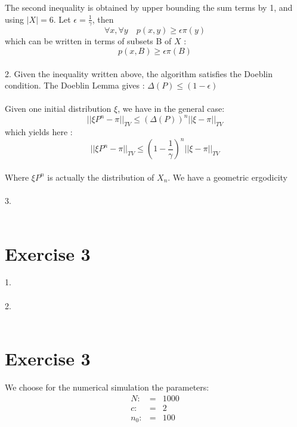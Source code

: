The second inequality is obtained by upper bounding the sum terms by 1, and using $|X|=6$.
Let $\boxed{\epsilon=\frac{1}{\gamma}}$, then
$$\forall x, \forall y \quad p(x,y) \geq \epsilon  \pi(y)$$
which can be written in terms of subsets B of $X$ :
$$\boxed{p(x,B) \geq \epsilon  \pi(B)}$$
~\\
2. Given the inequality written above, the algorithm satisfies the Doeblin condition. The Doeblin Lemma gives : $ \boxed{\Delta(P) \leq ( 1 - \epsilon )}$~\\
~\\
Given one initial distribution $\xi$, we have in the general case:
$$||\xi P^n - \pi||_{TV} \leq (\Delta(P))^{ n } ||\xi-\pi||_{TV}$$
which yields here :
$$ \boxed{||\xi P^n - \pi||_{TV} \leq (1-\frac{1}{\gamma})^{ n } ||\xi-\pi||_{TV}}$$~\\
Where $\xi P^n$ is actually the distribution of $X_n$. We have a geometric ergodicity~\\
~\\
3.~\\
~\\

\section*{Exercise 3}

1.~\\
~\\
2.~\\
~\\


\section*{Exercise 3}

 We choose for the numerical simulation the parameters:
 \begin{eqnarray*}
 	N :&=&1000\\
 	c :&=&2\\
 	n_0 :&=&100
 \end{eqnarray*}
 
